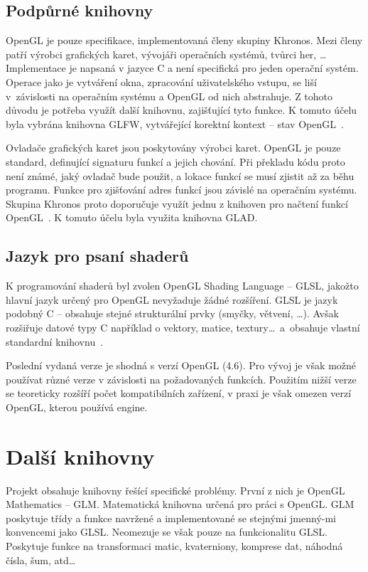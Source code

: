 \documentclass[thesis=M,czech]{FITthesis}[2019/12/23]
\begin{document}
\subsection{Podpůrné knihovny}
OpenGL je pouze specifikace, implementovaná členy skupiny Khronos. Mezi členy patří výrobci grafických karet, vývojáři operačních systémů, tvůrci her, \dots \cite{kronos_members} Implementace je napsaná v jazyce C a není specifická pro jeden operační systém. Operace jako je vytváření okna, zpracování uživatelského vstupu, se liší v~závislosti na operačním systému a OpenGL od nich abstrahuje. Z tohoto důvodu je potřeba využít další knihovnu, zajišťující tyto funkce. K tomuto účelu byla vybrána knihovna GLFW, vytvářející korektní kontext -- stav OpenGL~\cite{lopgl_window}.

Ovladače grafických karet jsou poskytovány výrobci karet. OpenGL je pouze standard, definující signaturu funkcí a jejich chování. Při překladu kódu proto není známé, jaký ovladač bude použit, a lokace funkcí se musí zjistit až za běhu programu. Funkce pro zjišťování adres funkcí jsou závislé na operačním systému. Skupina Khronos proto doporučuje využít jednu z knihoven pro načtení funkcí OpenGL~\cite{kronos_load_lib}. K tomuto účelu byla využita knihovna GLAD.

\subsection{Jazyk pro psaní shaderů}
K programování shaderů byl zvolen OpenGL Shading Language -- GLSL, jakožto hlavní jazyk určený pro OpenGL nevyžaduje žádné rozšíření. GLSL je jazyk podobný C – obsahuje stejné strukturální prvky (smyčky, větvení, \dots). Avšak rozšiřuje datové typy C například o vektory, matice, textury\dots ~a~obsahuje vlastní standardní knihovnu~\cite{kronos_glsl}.

Poslední vydaná verze je shodná s verzí OpenGL (4.6). Pro vývoj je však možné používat různé verze v závislosti na požadovaných funkcích. Použitím nižší verze se teoreticky rozšíří počet kompatibilních zařízení, v praxi je však omezen verzí OpenGL, kterou používá engine.

\section{Další knihovny}

Projekt obsahuje knihovny řešící specifické problémy. První z nich je OpenGL Mathematics -- GLM. Matematická knihovna určená pro práci s OpenGL. GLM poskytuje třídy a funkce navržené a implementované se stejnými jmenný-mi konvencemi jako GLSL. Neomezuje se však pouze na funkcionalitu GLSL. Poskytuje funkce na transformaci matic, kvaterniony, komprese dat, náhodná čísla, šum, atd\dots~\cite{glm_main}
\end{document}
